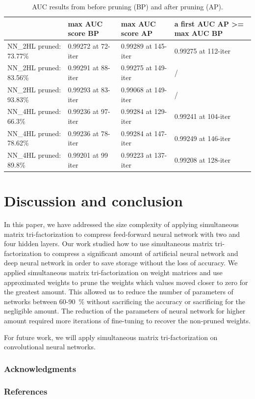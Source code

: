 \documentclass{article} %
\begin{document}
\begin{table}[!ht]
\centering
\begin{tabular}{l|l|l|p{3cm}|}
\cline{2-4}
 & max AUC score BP & max AUC score AP & a first AUC AP \textgreater= max AUC BP 
\\ \hline
\multicolumn{1}{|l|}{NN\_2HL pruned: 73.77\%} & 0.99272 at 72-iter & 0.99289 at 
145-iter & 0.99275 at 112-iter \\ \hline
\multicolumn{1}{|l|}{NN\_2HL pruned: 83.56\%} & 0.99291 at 88-iter & 0.99275 at 
149-iter & / \\ \hline
\multicolumn{1}{|l|}{NN\_2HL pruned: 93.83\%} & 0.99293 at 83-iter & 0.99068 at 
149-iter & / \\ \hline
\multicolumn{1}{|l|}{NN\_4HL pruned: 66.3\%} & 0.99236 at 97-iter & 0.99284 at 
129-iter & 0.99241 at 104-iter \\ \hline
\multicolumn{1}{|l|}{NN\_4HL pruned: 78.62\%} & 0.99236 at 78-iter & 0.99284 at 
147-iter & 0.99249 at 146-iter \\ \hline
\multicolumn{1}{|l|}{NN\_4HL pruned: 89.8\%} & 0.99201 at 99 iter & 0.99223 at 
137-iter & 0.99208 at 128-iter \\ \hline
\end{tabular}
\caption{AUC results from before pruning (BP) and after pruning (AP).}
\label{t:results}
\end{table}

\newpage 
\section{Discussion and conclusion}
In this paper, we have addressed the size complexity of applying simultaneous 
matrix tri-factorization to compress feed-forward neural network with two and 
four hidden layers. Our work studied how to use simultaneous matrix 
tri-factorization to compress a significant amount of artificial neural network 
and deep neural network in order to save storage without the loss of accuracy. 
We applied simultaneous matrix tri-factorization on weight matrices and use 
approximated weights to prune the weights which values moved closer to zero for 
the greatest amount. This allowed us to reduce the number of parameters of 
networks between 60-90~\% without sacrificing the accuracy or sacrificing for 
the negligible amount. The reduction of the parameters of neural network for 
higher amount required more iterations of fine-tuning to recover the non-pruned 
weights. 

For future work, we will apply simultaneous matrix tri-factorization on 
convolutional neural networks.




\subsubsection*{Acknowledgments}


\subsubsection*{References}



\end{document}
